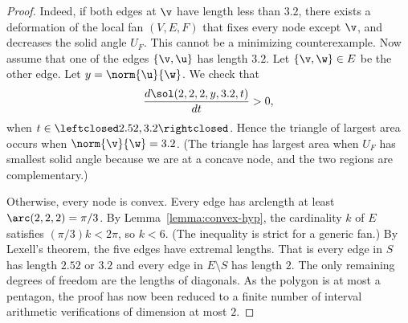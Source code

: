 \begin{proof}
  Indeed,%
if both edges at $\v$ have length less than $3.2$, there exists a
deformation of the local fan $(V,E,F)$ that fixes every node except
$\v$, and decreases the solid angle $U_F$.  This cannot be a
minimizing counterexample.  Now assume that one of the edges
$\{\v,\u\}$ has length $3.2$.  Let $\{\v,\w\}\in E$ be the other edge.
Let
$y=\norm{\u}{\w}$.  We check that
\[
\dfrac{d\sol(2,2,2,y,3.2,t)}{dt} >0,
\]
when $t\in\leftclosed2.52,3.2\rightclosed$.  Hence the triangle of largest area occurs
when $\norm{\v}{\w}=3.2$.  (The triangle has largest area when $U_F$
has smallest solid angle because we are at a concave node, and the two regions
are complementary.)


  Otherwise,
every node is convex.  Every edge has arclength at least
$\arc(2,2,2)=\pi/3$.  By Lemma~\ref{lemma:convex-hyp}, the cardinality
$k$ of $E$ satisfies $(\pi/3)k < 2\pi$, so $k<6$.  (The inequality is
strict for a generic fan.)  By Lexell's theorem, the five edges have
extremal lengths.  That is every edge in $S$ has length $2.52$ or
$3.2$ and every edge in $E\setminus S$ has length $2$.  The only
remaining degrees of freedom are the lengths of diagonals.  As the
polygon is at most a pentagon, the proof has now been reduced to a
finite number of interval arithmetic verifications of dimension at
most $2$.


\end{proof}
